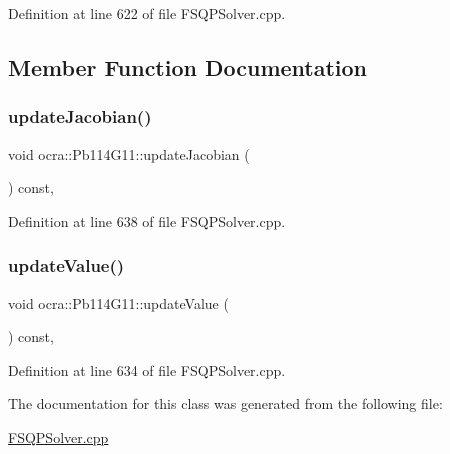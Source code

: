 Definition at line 622 of file F\+S\+Q\+P\+Solver.\+cpp.



\subsection{Member Function Documentation}
\hypertarget{classocra_1_1Pb114G11_a5dcd54dcc5ef337f78083f676d5d03bb}{}\label{classocra_1_1Pb114G11_a5dcd54dcc5ef337f78083f676d5d03bb} 
\subsubsection{\texorpdfstring{update\+Jacobian()}{updateJacobian()}}
{\footnotesize\ttfamily void ocra\+::\+Pb114\+G11\+::update\+Jacobian (\begin{DoxyParamCaption}{ }\end{DoxyParamCaption}) const\hspace{0.3cm}{\ttfamily [inline]}, {\ttfamily [protected]}}



Definition at line 638 of file F\+S\+Q\+P\+Solver.\+cpp.

\hypertarget{classocra_1_1Pb114G11_a21e66a9f60492d3c0ff7ed678d39de56}{}\label{classocra_1_1Pb114G11_a21e66a9f60492d3c0ff7ed678d39de56} 
\subsubsection{\texorpdfstring{update\+Value()}{updateValue()}}
{\footnotesize\ttfamily void ocra\+::\+Pb114\+G11\+::update\+Value (\begin{DoxyParamCaption}{ }\end{DoxyParamCaption}) const\hspace{0.3cm}{\ttfamily [inline]}, {\ttfamily [protected]}}



Definition at line 634 of file F\+S\+Q\+P\+Solver.\+cpp.



The documentation for this class was generated from the following file\+:\begin{DoxyCompactItemize}
\item 
\hyperlink{FSQPSolver_8cpp}{F\+S\+Q\+P\+Solver.\+cpp}\end{DoxyCompactItemize}
